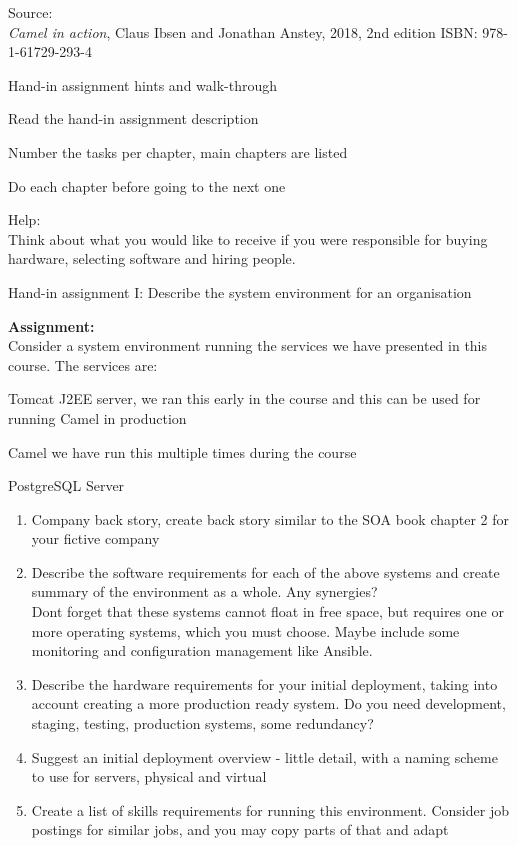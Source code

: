 \documentclass[Screen16to9,17pt]{foils}
\begin{document}
Source: {\footnotesize\\
\emph{Camel in action}, Claus Ibsen and Jonathan Anstey, 2018, 2nd edition
ISBN: 978-1-61729-293-4}






Hand-in assignment hints and walk-through

\begin{list2}
  \item Read the hand-in assignment description
  \item Number the tasks per chapter, main chapters are listed
  \item Do each chapter before going to the next one
\end{list2}

Help:\\
Think about what you would like to receive if you were responsible for buying hardware, selecting software and hiring people.



Hand-in assignment I: Describe the system environment for an organisation

{\bf Assignment:}\\
Consider a system environment running the services we have presented in this course. The services are:

\begin{list2}
\item Tomcat J2EE server, we ran this early in the course and this can be used for running Camel in production
\item Camel we have run this multiple times during the course
\item PostgreSQL Server
\end{list2}


\begin{enumerate}
\item Company back story, create back story similar to the SOA book chapter 2 for your fictive company
\item Describe the software requirements for each of the above systems and create summary of the environment as a whole. Any synergies?\\
Dont forget that these systems cannot float in free space, but requires one or more operating systems, which you must choose. Maybe include some monitoring and configuration management like Ansible.
\item Describe the hardware requirements for your initial deployment, taking into account creating a more production ready system. Do you need development, staging, testing, production systems, some redundancy?
\item Suggest an initial deployment overview - little detail, with a naming scheme to use for servers, physical and virtual
\item Create a list of skills requirements for running this environment. Consider job postings for similar jobs, and you may copy parts of that and adapt
\end{enumerate}
\end{document}
